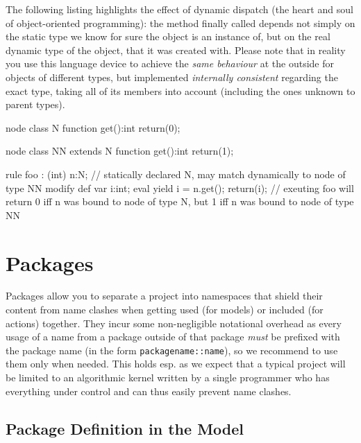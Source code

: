\begin{example}
The following listing highlights the effect of dynamic dispatch (the heart and soul of object-oriented programming): 
the method finally called depends not simply on the static type we know for sure the object is an instance of,
but on the real dynamic type of the object, that it was created with.
Please note that in reality you use this language device to achieve the \emph{same behaviour} at the outside for objects of different types, but implemented \emph{internally consistent} regarding the exact type, taking all of its members into account (including the ones unknown to parent types).
	\begin{grgen}
node class N
{	
	function get():int
	{
		return(0);
	}
}

node class NN extends N
{	
	function get():int
	{
		return(1);
	}
}

rule foo : (int)
{
	n:N; // statically declared N, may match dynamically to node of type NN
	modify {
		def var i:int;
		eval {
			yield i = n.get();
		}
		return(i); // exeuting foo will return 0 iff n was bound to node of type N, but 1 iff n was bound to node of type NN
	}
}
	\end{grgen}
\end{example}


\section{Packages}\label{sec:packages}

Packages allow you to separate a project into namespaces that shield their content from name clashes when getting used (for models) or included (for actions) together.
They incur some non-negligible notational overhead as every usage of a name from a package outside of that package \emph{must} be prefixed with the package name (in the form \verb#packagename::name#), so we recommend to use them only when needed.
This holds esp. as we expect that a typical project will be limited to an algorithmic kernel written by a single programmer who has everything under control and can thus easily prevent name clashes.

\subsection{Package Definition in the Model}\label{sub:packagemodel} 

